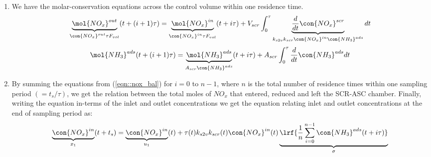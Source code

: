 \begin{enumerate}
        \item We have the molar-conservation equations across the control volume within one residence time.
                \begin{multline}
                        \underbrace{\mol{NO_x}^{out} }_{ \con{NO_x}^{out} \tau F_{vol} } (t + (i+1) \tau) =
                                \underbrace{\mol{NO_x}^{in} }_{ \con{NO_x}^{in} \tau F_{vol} } (t + i \tau)
                                + V_{scr} \int_0^{\tau}
                                                \underbrace{\frac{d}{dt} \con{NO_x}^{scr}}_
                                                        {k_{s2v} k_{scr} \con{NO_x}^{in} \con{NH_3}^{ads}}
                                           dt
                        \label{eqn::nox_bal}
                \end{multline}
                \begin{multline}
                       \mol{NH_3}^{ads} (t + (i+1) \tau) =
                                \underbrace{\mol{NH_3}^{ads} }_{A_{scr} \con{NH_3}^{ads}} (t + i \tau)
                                + A_{scr} \int_0^{\tau}
                                               \frac{d}{dt} \con{NH_3}^{ads}
                                                dt
                        \label{eqn::ads_bal}
                \end{multline}
        \item By summing the equations from (\ref{eqn::nox_bal}) for  $i = 0$ to $n-1$, where $n$ is the total number of residence times within one sampling period $(= t_s/\tau)$, we get the relation between the total moles of $NO_x$ that entered, reduced and left the SCR-ASC chamber. Finally, writing the equation in-terms of the inlet and outlet concentrations we get the equation relating inlet and outlet concentrations at the end of sampling period as:
                \begin{multline}
                        \underbrace{\con{NO_x}^{in}}_{x_1}(t + t_s) =
                                \underbrace{\con{NO_x}^{in}}_{u_1}(t) + \tau(t) k_{s2v} k_{scr}(t) \con{NO_x}^{in}(t) \underbrace{\lrf{\frac{1}{n} \sum_{i = 0}^{n-1} \con{NH_3}^{ads}(t + i \tau)}}_{\sigma}
                        \label{eqn::nox_avg}
                \end{multline}


\end{enumerate}
